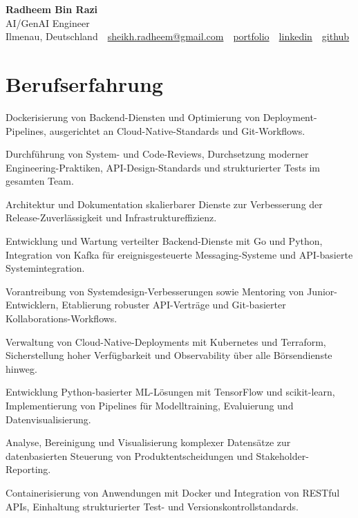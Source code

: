 \documentclass[11pt,a4paper]{resume}
\makeatletter
\newcommand{\Portfolio}{https://radheem.github.io/my-cv}
\newcommand{\PortfolioText}{portfolio}
\newcommand{\GitHub}{https://github.com/radheem}
\newcommand{\LinkedIn}{https://www.linkedin.com/in/radheem-razi}
\newcommand{\Email}{sheikh.radheem@gmail.com}
\makeatother
\begin{document}
\clearpage
{}

\begin{center}
  {\huge\bfseries Radheem Bin Razi}\\[3pt]
  {\large AI/GenAI Engineer}\\[6pt]
  \small
  Ilmenau, Deutschland \,\textbar\,
  \href{mailto:\Email}{\Email} \,\textbar\,
  \href{\Portfolio}{\PortfolioText} \,\textbar\,
  \href{\LinkedIn}{linkedin} \,\textbar\,
  \href{\GitHub}{github}
\end{center}
\vspace{2pt}

\section{Berufserfahrung}

\bullets
  \item Dockerisierung von Backend-Diensten und Optimierung von Deployment-Pipelines, ausgerichtet an Cloud-Native-Standards und Git-Workflows.
  \item Durchführung von System- und Code-Reviews, Durchsetzung moderner Engineering-Praktiken, API-Design-Standards und strukturierter Tests im gesamten Team.
  \item Architektur und Dokumentation skalierbarer Dienste zur Verbesserung der Release-Zuverlässigkeit und Infrastruktureffizienz.
\bulletsend
\vspace{3pt}
\bullets
  \item Entwicklung und Wartung verteilter Backend-Dienste mit Go und Python, Integration von Kafka für ereignisgesteuerte Messaging-Systeme und API-basierte Systemintegration.
  \item Vorantreibung von Systemdesign-Verbesserungen sowie Mentoring von Junior-Entwicklern, Etablierung robuster API-Verträge und Git-basierter Kollaborations-Workflows.
  \item Verwaltung von Cloud-Native-Deployments mit Kubernetes und Terraform, Sicherstellung hoher Verfügbarkeit und Observability über alle Börsendienste hinweg.
\bulletsend
\vspace{3pt}
\bullets
  \item Entwicklung Python-basierter ML-Lösungen mit TensorFlow und scikit-learn, Implementierung von Pipelines für Modelltraining, Evaluierung und Datenvisualisierung.
  \item Analyse, Bereinigung und Visualisierung komplexer Datensätze zur datenbasierten Steuerung von Produktentscheidungen und Stakeholder-Reporting.
  \item Containerisierung von Anwendungen mit Docker und Integration von RESTful APIs, Einhaltung strukturierter Test- und Versionskontrollstandards.
\bulletsend
\vspace{3pt}
\end{document}
